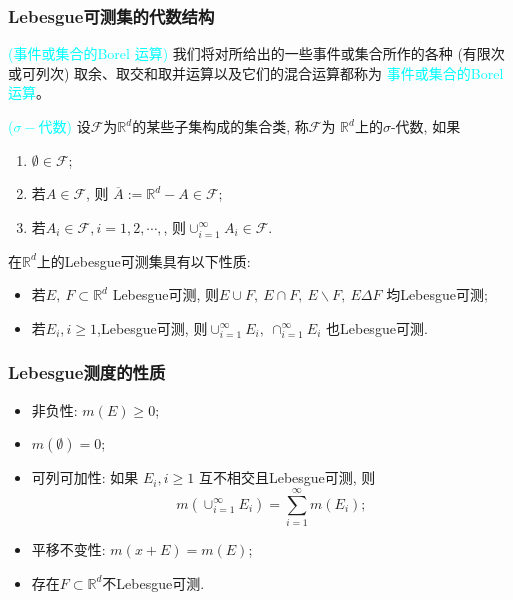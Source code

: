 \begin{frame}
	\frametitle{{\rm Lebesgue}可测集的代数结构}
	\begin{defi}\textcolor{cyan}{(事件或集合的{\rm Borel} 运算)}
		我们将对所给出的一些事件或集合所作的各种 (有限次或可列次) 取余、取交和取并运算以及它们的混合运算都称为 \textcolor{cyan}{事件或集合的{\rm Borel} 运算}。
	\end{defi}
\vspace{0.3cm}

	\pause
	\begin{defi}\textcolor{cyan}{($\sigma-$代数)} 设$\mathcal{F}$为$\mathbb{R}^d$的某些子集构成的集合类, 称$\mathcal{F}$为 $\mathbb{R}^d$上的$\sigma$-代数, 如果
		\begin{enumerate}[<+-|alert@+>][(1)]
			\item $\emptyset\in \mathcal{F}$;
			\item 若$A\in \mathcal{F}$, 则 $\overline{A}:=\mathbb{R}^d-A\in \mathcal{F}$;
			\item 若$A_i\in \mathcal{F}, i=1, 2,\cdots,$, 则$\cup_{i=1}^{\infty}A_i\in \mathcal{F}$.
		\end{enumerate}
	\end{defi}

	\vspace{0.3cm}
\pause
\begin{prop}
  在$\mathbb{R}^d$上的Lebesgue可测集具有以下性质:
  \begin{itemize}[<+-|alert@+>]
	\item 若$E,\  F\subset\mathbb{R}^d$ {\rm Lebesgue}可测, 则$E\cup F,\  E\cap F,\  E\backslash F,\  E\Delta F$ 均{\rm Lebesgue}可测;
	\item 若$E_i, i\geq 1$,{\rm Lebesgue}可测, 则$\cup_{i=1}^\infty E_i, \  \cap_{i=1}^\infty E_i$ 也{\rm Lebesgue}可测.
\end{itemize}
\end{prop}


\end{frame}


\begin{frame}
	\frametitle{{\rm Lebesgue}测度的性质}


	\begin{itemize}[<+-|alert@+>]
		\item 非负性: $m(E)\geq 0$;
		\item $m(\emptyset)=0$;
		\item 可列可加性: 如果 $E_i, i\geq 1 $ 互不相交且{\rm Lebesgue}可测, 则 \[m(\cup_{i=1}^\infty E_i)=\sum_{i=1}^\infty m(E_i);\]
		\item 平移不变性: $m(x+E)=m(E)$;
		\item 存在$F\subset\mathbb{R}^d$不{\rm Lebesgue}可测.

	\end{itemize}
\end{frame}









